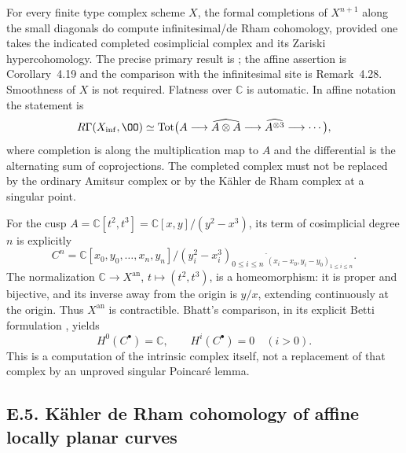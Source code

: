 For every finite type complex scheme $X$, the formal completions of $X^{n+1}$ along the small diagonals do compute infinitesimal/de Rham cohomology, provided one takes the indicated completed cosimplicial complex and its Zariski hypercohomology.  The precise primary result is \cite[Corollary~4.30]{Bhatt2012}; the affine assertion is Corollary~4.19 and the comparison with the infinitesimal site is Remark~4.28.  Smoothness of $X$ is not required.  Flatness over $\mathbb C$ is automatic.  In affine notation the statement is
\[
 R\Gamma(X_{\mathrm{inf}},\OO)\simeq
 \operatorname{Tot}\bigl(A\longrightarrow\widehat{A\otimes A}
     \longrightarrow\widehat{A^{\otimes3}}\longrightarrow\cdots\bigr),
\]
where completion is along the multiplication map to $A$ and the differential is the alternating sum of coprojections.  The completed complex must not be replaced by the ordinary Amitsur complex or by the K\"ahler de Rham complex at a singular point.

For the cusp $A=\mathbb C[t^2,t^3]=\mathbb C[x,y]/(y^2-x^3)$, its term of cosimplicial degree $n$ is explicitly
\[
 C^n=\mathbb C[x_0,y_0,\ldots,x_n,y_n]/(y_i^2-x_i^3)_{0\leq i\leq n}
       \ {}^{\widehat{\ }}_{(x_i-x_0,y_i-y_0)_{1\leq i\leq n}}.
\]
The normalization $\mathbb C\to X^{\mathrm{an}}$, $t\mapsto(t^2,t^3)$, is a homeomorphism: it is proper and bijective, and its inverse away from the origin is $y/x$, extending continuously at the origin.  Thus $X^{\mathrm{an}}$ is contractible.  Bhatt's comparison, in its explicit Betti formulation \cite[Example~4.23]{Bhatt2012}, yields
\[
 H^0(C^\bullet)=\mathbb C,\qquad H^i(C^\bullet)=0\quad(i>0).
\]
This is a computation of the intrinsic complex itself, not a replacement of that complex by an unproved singular Poincar\'e lemma.

\subsection{E.5. K\"ahler de Rham cohomology of affine locally planar curves}

